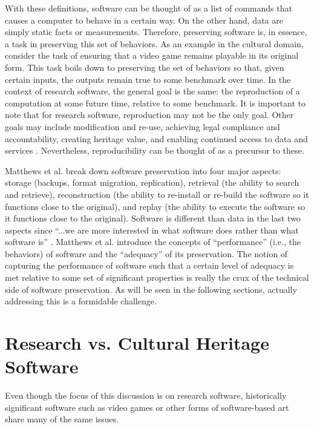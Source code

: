 \documentclass[letterpaper,11pt]{article}
\begin{document}
With these definitions, software can be thought of as a list of commands that causes a computer to behave in a certain way. On the other hand, data are simply static facts or measurements. Therefore, preserving software is, in essence, a task in preserving this set of behaviors. As an example in the cultural domain, consider the task of ensuring that a video game remains playable in its original form. This task boils down to preserving the set of behaviors so that, given certain inputs, the outputs remain true to some benchmark over time. In the context of research software, the general goal is the same: the reproduction of a computation at some future time, relative to some benchmark. It is important to note that for research software, reproduction may not be the only goal. Other goals may include modification and re-use, achieving legal compliance and accountability, creating heritage value, and enabling continued access to data and services \citep{hong2010}. Nevertheless, reproducibility can be thought of as a precursor to these.

Matthews et al. \citep{matthews2010} break down software preservation into four major aspects: storage (backups, format migration, replication), retrieval (the ability to search and retrieve), reconstruction (the ability to re-install or re-build the software so it functions close to the original), and replay (the ability to execute the software so it functions close to the original). Software is different than data in the last two aspects since ``...we are more interested in what software does rather than what software is'' \citep{matthews2010}. Matthews et al. introduce the concepts of ``performance'' (i.e., the behaviors) of software and the ``adequacy'' of its preservation. The notion of capturing the performance of software such that a certain level of adequacy is met relative to some set of significant properties is really the crux of the technical side of software preservation. As will be seen in the following sections, actually addressing this is a formidable challenge.

\section{Research vs. Cultural Heritage Software}
Even though the focus of this discussion is on research software, historically significant software such as video games or other forms of software-based art share many of the same issues.
\end{document}
